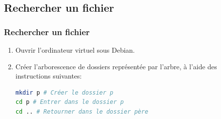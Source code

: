 \documentclass[svgnames,11pt]{beamer}
\begin{document}
\subsection{Rechercher un fichier}
\begin{frame}[fragile]
    \frametitle{Rechercher un fichier}
        \begin{center}
        \end{center}
    \begin{activite}
        \begin{enumerate}
            \item Ouvrir l'ordinateur virtuel sous Debian.
            \item Créer l'arborescence de dossiers représentée par l'arbre, à l'aide des instructions suivantes:\\
            \begin{lstlisting}[language=bash , basicstyle=\ttfamily\small, xleftmargin=2em, xrightmargin=0em]
mkdir p # Créer le dossier p
cd p # Entrer dans le dossier p
cd .. # Retourner dans le dossier père
\end{lstlisting}
        \end{enumerate}
    \end{activite}

\end{frame}
\end{document}
